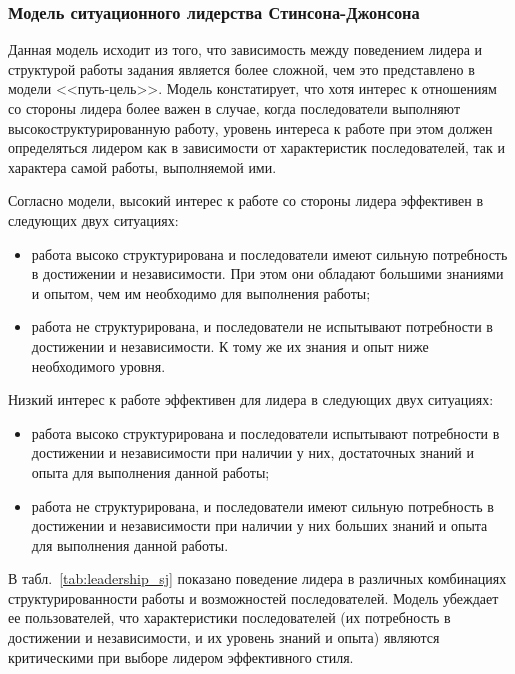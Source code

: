 \documentclass[a4paper,12pt,oneside,final]{extarticle}
\numberwithin{equation}{section}
\begin{document}
\subsubsection{Модель ситуационного лидерства Стинсона-Джонсона}
Данная модель исходит из того, что зависимость между поведением лидера и структурой работы задания является более сложной, чем это представлено в модели <<путь-цель>>. 
Модель констатирует, что хотя интерес к отношениям со стороны лидера более важен в случае, когда последователи выполняют высокоструктурированную работу, уровень интереса к работе при этом должен определяться лидером как в зависимости от характеристик последователей, так и характера самой работы, выполняемой ими.

Согласно модели, высокий интерес к работе со стороны лидера эффективен в следующих двух ситуациях:
\begin{itemize}
	\item работа высоко структурирована и последователи имеют сильную потребность в достижении и независимости. 
	При этом они обладают большими знаниями и опытом, чем им необходимо для выполнения работы;
	\item работа не структурирована, и последователи не испытывают потребности в достижении и независимости. 
	К тому же их знания и опыт ниже необходимого уровня.
\end{itemize}

Низкий интерес к работе эффективен для лидера в следующих двух ситуациях:
\begin{itemize}
	\item работа высоко структурирована и последователи испытывают потребности в достижении и независимости при наличии у них, достаточных знаний и опыта для выполнения данной работы;
	\item работа не структурирована, и последователи имеют сильную потребность в достижении и независимости при наличии у них больших знаний и опыта для выполнения данной работы. 
\end{itemize}

В табл.~\ref{tab:leadership_sj} показано поведение лидера в различных комбинациях структурированности работы и возможностей последователей. 
Модель убеждает ее пользователей, что характеристики последователей (их потребность в достижении и независимости, и их уровень знаний и опыта) являются критическими при выборе лидером эффективного стиля.
\end{document}
